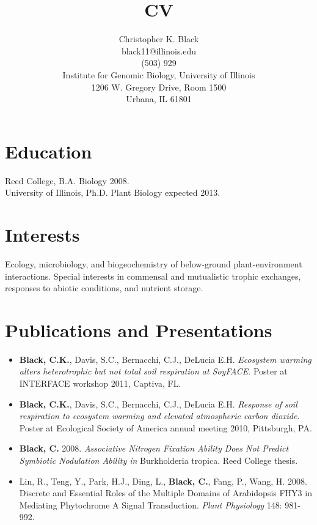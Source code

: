 \documentclass[centered,margin, 11pt]{resume}
\title{CV}
\author{Christopher K. Black\\
black11@illinois.edu\\
(503) 929\textendash 9421\\
Institute for Genomic Biology, University of Illinois\\
1206 W. Gregory Drive, Room 1500\\
Urbana, IL 61801}
\begin{document}
\maketitle

\section{Education}
Reed College, B.A. Biology 2008.\\
University of Illinois, Ph.D. Plant Biology expected 2013. 

\section{Interests}
Ecology, microbiology, and biogeochemistry of below-ground plant-environment interactions. Special interests in commensal and mutualistic trophic exchanges, responses to abiotic conditions, and nutrient storage.

\section{Publications and Presentations}
\begin{itemize}
	\item{{\bf Black, C.K.}, Davis, S.C., Bernacchi, C.J., DeLucia E.H. \textit{Ecosystem warming alters heterotrophic but not total soil respiration at SoyFACE}. Poster at INTERFACE workshop 2011, Captiva, FL.}
	\item{{\bf Black, C.K.}, Davis, S.C., Bernacchi, C.J., DeLucia E.H. \textit{Response of soil respiration to ecosystem warming and elevated atmospheric carbon dioxide}. Poster at Ecological Society of America annual meeting 2010, Pittsburgh, PA.}
	\item{{\bf Black, C.} 2008. \textit{Associative Nitrogen Fixation Ability Does Not Predict Symbiotic Nodulation Ability in} Burkholderia tropica. Reed College thesis.}
	\item{Lin, R., Teng, Y., Park, H.J., Ding, L., {\bf Black, C.}, Fang, P., Wang, H. 2008. Discrete and Essential Roles of the Multiple Domains of Arabidopsis FHY3 in Mediating Phytochrome A Signal Transduction. \textit{Plant Physiology} 148: 981-992.}
\end{itemize}
\end{document}

